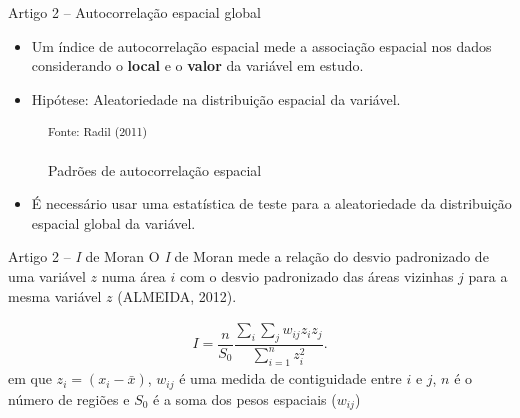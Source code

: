 \documentclass[aspectratio=169]{beamer}
\begin{document}
\begin{frame}{Artigo 2 -- Autocorrelação espacial global}
	\begin{itemize}
		\item Um índice de autocorrelação espacial mede a associação espacial nos dados considerando o \textbf{local} e o \textbf{valor} da variável em estudo.
		\item Hipótese: Aleatoriedade na distribuição espacial da variável. 
	\end{itemize}
	
	\begin{figure}
		\centering
		\small
		\hspace{0.2cm}
		\hspace{0.2cm}
		\caption{Padrões de autocorrelação espacial}
		\small \textsuperscript {Fonte: Radil (2011)}
		\label{padroes_autocorr}
	\end{figure}
	\begin{itemize}
		\item É necessário usar uma estatística de teste para a aleatoriedade da distribuição espacial global da variável.
	\end{itemize}
\end{frame}

\begin{frame}{Artigo 2 -- \textit{I} de Moran}
	O \textit{I} de Moran mede a relação do desvio padronizado de uma variável $z$ numa área $i$ com o desvio padronizado das 	áreas vizinhas $j$ para a mesma variável $z$ (ALMEIDA, 2012).
	
	\begin{block}{}
		\small
		\begin{align}
		\label{IMoran}
		I = \dfrac{n}{S_0} \dfrac{\displaystyle\sum_{i} \sum_{j} w_{ij} z_i z_j}{\displaystyle\sum_{i=1}^{n} z_i^2}.
		\end{align}
		\noindent \small em que $z_i = (x_i - \bar{x})$, $w_{ij}$ é uma medida de contiguidade entre $i$ e $j$,  $n$ é o número de regiões e $S_0$ é a soma dos pesos espaciais ($w_{ij}$)
	\end{block}	
\end{frame}
\end{document}
